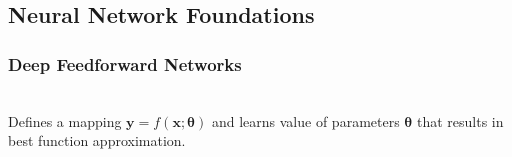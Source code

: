 \subsection{Neural Network Foundations}

\subsubsection{Deep Feedforward Networks}

\begin{remark} \\
Defines a mapping $\bm{y} = f(\bm{x}; \bm{\theta})$ and learns value of parameters $\bm{\theta}$ that results in best function approximation.
\end{remark}

